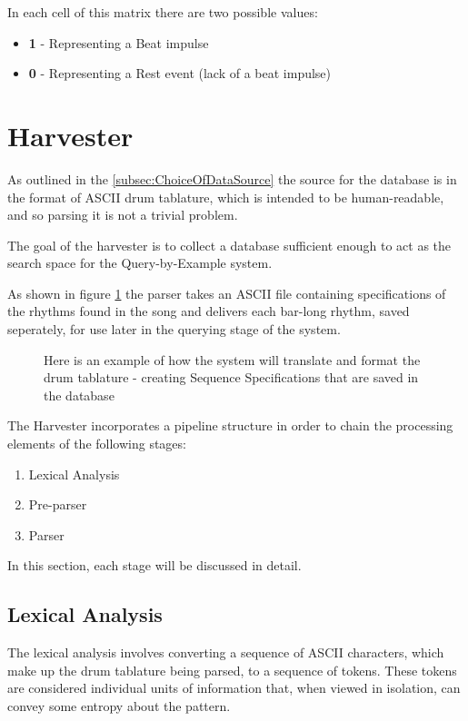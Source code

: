 \documentclass[12pt,twoside,notitlepage]{report}
\begin{document}
				In each cell of this matrix there are two possible values:
					\begin{itemize}
						\item{\textbf{1} - Representing a Beat impulse}
						\item{\textbf{0} - Representing a Rest event (lack of a beat impulse)}
					\end{itemize}
					

	
	\section{Harvester}\label{sec:Harvester}
	As outlined in the \ref{subsec:ChoiceOfDataSource} the source for the database is in the format of ASCII drum tablature, which is intended to be human-readable, and so parsing it is not a trivial problem. 
	
	The goal of the harvester is to collect a database sufficient enough to act as the search space for the Query-by-Example system.
	
	As shown in figure \ref{exampleIdealParse} the parser takes an ASCII file containing specifications of the rhythms found in the song and delivers each bar-long rhythm, saved seperately, for use later in the querying stage of the system.
	

\begin{figure}[h]
			\caption{\label{exampleIdealParse} Here is an example of how the system will translate and format the drum tablature - creating Sequence Specifications that are saved in the database}
\end{figure}


		The Harvester incorporates a pipeline structure in order to chain the processing elements of the following stages:
	
		\begin{enumerate}
			\item{Lexical Analysis}
			\item{Pre-parser}
			\item{Parser}
		\end{enumerate}
		In this section, each stage will be discussed in detail.
		

		\subsection{Lexical Analysis}
				
		
		The lexical analysis involves converting a sequence of ASCII characters, which make up the drum tablature being parsed, to a sequence of tokens. These tokens are considered individual units of information that, when viewed in isolation, can convey some entropy about the pattern.
		
\end{document}
